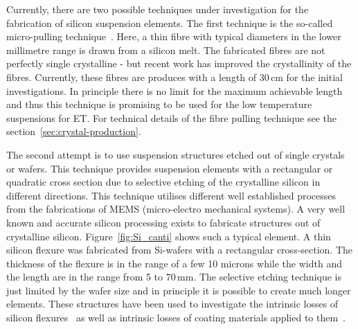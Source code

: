 Currently, there are two possible techniques under investigation for the fabrication of silicon suspension elements. The first technique is the so-called micro-pulling technique~\cite{articolofibresil}. Here, a thin fibre with typical diameters in the lower millimetre range is drawn from a silicon melt. The fabricated fibres are not perfectly single crystalline - but recent work has improved the crystallinity of the fibres. Currently, these fibres are produces with a length of 30\,cm for the initial investigations. In principle there is no limit for the maximum achievable length and thus this technique is promising to be used for the low temperature suspensions for ET. For technical details of the fibre pulling technique see the section~\ref{sec:crystal-production}.

The second attempt is to use suspension structures etched out of single crystals or wafers. This technique provides suspension elements with a rectangular or quadratic cross section due to selective etching of the crystalline silicon in different directions. This technique utilises different well established processes from the fabrications of MEMS (micro-electro mechanical systems). A very well known and accurate silicon processing exists to fabricate structures out of crystalline silicon. Figure~\ref{fig:Si_canti} shows such a typical element. A thin silicon flexure was fabricated from Si-wafers with a rectangular cross-section. The thickness of the flexure is in the range of a few 10 microns while the width and the length are in the range from 5 to 70\,mm. The selective etching technique is just limited by the wafer size and in principle it is possible to create much longer elements. These structures have been used to investigate the intrinsic losses of silicon flexures~\cite{Reid2006} as well as intrinsic losses of coating materials applied to them~\cite{Martin2008,Martin2009,Martin2010}.

